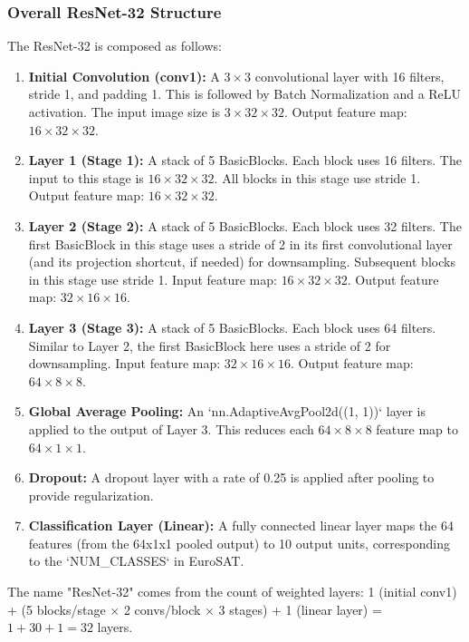 \documentclass[11pt, a4paper]{article}
\begin{document}
\subsubsection{Overall ResNet-32 Structure}
The ResNet-32 is composed as follows:
\begin{enumerate}[label=\arabic*), itemsep=0.5em]
    \item \textbf{Initial Convolution (conv1):} A $3 \times 3$ convolutional layer with 16 filters, stride 1, and padding 1. This is followed by Batch Normalization and a ReLU activation. The input image size is $3 \times 32 \times 32$. Output feature map: $16 \times 32 \times 32$.
    \item \textbf{Layer 1 (Stage 1):} A stack of 5 BasicBlocks. Each block uses 16 filters. The input to this stage is $16 \times 32 \times 32$. All blocks in this stage use stride 1. Output feature map: $16 \times 32 \times 32$.
    \item \textbf{Layer 2 (Stage 2):} A stack of 5 BasicBlocks. Each block uses 32 filters. The first BasicBlock in this stage uses a stride of 2 in its first convolutional layer (and its projection shortcut, if needed) for downsampling. Subsequent blocks in this stage use stride 1. Input feature map: $16 \times 32 \times 32$. Output feature map: $32 \times 16 \times 16$.
    \item \textbf{Layer 3 (Stage 3):} A stack of 5 BasicBlocks. Each block uses 64 filters. Similar to Layer 2, the first BasicBlock here uses a stride of 2 for downsampling. Input feature map: $32 \times 16 \times 16$. Output feature map: $64 \times 8 \times 8$.
    \item \textbf{Global Average Pooling:} An `nn.AdaptiveAvgPool2d((1, 1))` layer is applied to the output of Layer 3. This reduces each $64 \times 8 \times 8$ feature map to $64 \times 1 \times 1$.
    \item \textbf{Dropout:} A dropout layer with a rate of 0.25 is applied after pooling to provide regularization.
    \item \textbf{Classification Layer (Linear):} A fully connected linear layer maps the 64 features (from the 64x1x1 pooled output) to 10 output units, corresponding to the `NUM_CLASSES` in EuroSAT.
\end{enumerate}
The name "ResNet-32" comes from the count of weighted layers: 1 (initial conv1) + (5 blocks/stage $\times$ 2 convs/block $\times$ 3 stages) + 1 (linear layer) = $1 + 30 + 1 = 32$ layers.
\end{document}
